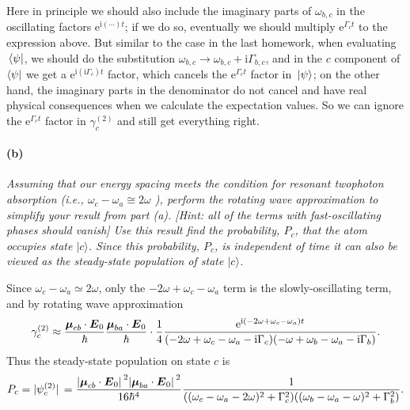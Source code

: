 \documentclass[hyperref, a4paper]{article}
\newcommand*{\ii}{\mathrm{i}}
\newcommand*{\ee}{\mathrm{e}}
\begin{document}
Here in principle we should also include the imaginary parts of $\omega_{b, c}$
in the oscillating factors $\ee^{\ii (\cdots) t}$; 
if we do so, eventually we should multiply $\ee^{\Gamma_c t}$ 
to the expression above.
But similar to the case in the last homework, 
when evaluating $\bra*{\psi}$, 
we should do the substitution $\omega_{b, c} \to \omega_{b, c} + \ii \Gamma_{b, c}$, 
and in the $c$ component of $\bra{\psi}$ we get a $\ee^{ \ii (\ii \Gamma_c) t}$ factor, 
which cancels the $\ee^{ \Gamma_c t}$ factor in $\ket*{\psi}$;
on the other hand, the imaginary parts in the denominator do not cancel 
and have real physical consequences when we calculate the expectation values. 
So we can ignore the $\ee^{\Gamma_c t}$ factor in $\gamma_c^{(2)}$
and still get everything right. 

\paragraph*{(b)} \textit{
    Assuming that our energy spacing meets the condition for resonant twophoton absorption (i.e., $\omega_c-\omega_a \cong 2 \omega$ ), perform the rotating wave approximation to simplify your result from part (a). [Hint: all of the terms with fast-oscillating phases should vanish] Use this result find the probability, $P_c$, that the atom occupies state $|c\rangle$. Since this probability, $P_c$, is independent of time it can also be viewed as the steady-state population of state $|c\rangle$.
}

Since $\omega_c - \omega_a \simeq 2 \omega$, 
only the $- 2 \omega + \omega_c - \omega_a$ term is the slowly-oscillating term, 
and by rotating wave approximation 
\begin{equation}
    \gamma_c^{(2)} \approx \frac{\vb*{\mu}_{cb} \cdot \vb*{E}_0}{\hbar} 
    \frac{\vb*{\mu}_{ba} \cdot \vb*{E}_0}{\hbar} \cdot \frac{1}{4} 
    \frac{
        \ee^{\ii (- 2 \omega + \omega_c - \omega_a ) t}
    }{
        (- 2\omega + \omega_c - \omega_a - \ii \Gamma_c) (- \omega + \omega_b - \omega_a - \ii \Gamma_b)
    } .
\end{equation}
Thus the steady-state population on state $c$ is 
\begin{equation}
    P_c = \abs*{\psi_c^{(2)}} = \frac{
        \abs*{\vb*{\mu}_{cb} \cdot \vb*{E}_0}^2 
        \abs*{\vb*{\mu}_{ba} \cdot \vb*{E}_0}^2
    }{16 \hbar^4} 
    \frac{1}{
        ((\omega_c - \omega_a - 2 \omega)^2 + \Gamma_c^2 )
        ((\omega_b - \omega_a - \omega)^2 + \Gamma_b^2)
    }.
\end{equation}
\end{document}
